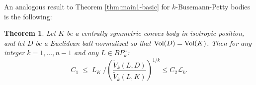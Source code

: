 \documentclass[12pt,oneside]{amsart}
\newtheorem{thm}{Theorem}[section] %
\theoremstyle{definition}
\theoremstyle{remark}
\theoremstyle{proof}
\numberwithin{equation}{section}
\newcommand{\brac}[1]{\left(#1\right)}
\newcommand{\BP}{BP}
\newcommand{\Lk}{\mathcal{L}_k}
\newcommand{\Vol}[1]{\textnormal{Vol} (#1)}
\newcommand{\VolRatio}[2]{\brac{\frac{\Vol{#1}}{\Vol{#2}}}^{1/n}}
\begin{document}
An analogous result to Theorem \ref{thm:main1-basic} for
$k$-Busemann-Petty bodies is the following:

\begin{thm} \label{thm:main2-basic}
Let $K$ be a centrally symmetric convex body in isotropic
position, and let $D$ be a Euclidean ball normalized so that
$\Vol{D} = \Vol{K}$. Then for any integer $k = 1,\ldots,n-1$ and
any $L \in \BP_k^n$:
\begin{equation} \label{eq:main2-basic}
C_1 \; \leq \; L_K \; / \brac{ \frac{ \widetilde{V}_{k}(L,D) }
{\widetilde{V}_{k}(L,K)}}^{1/k} \leq C_2 \Lk.
\end{equation}
\end{thm}

\end{document}
